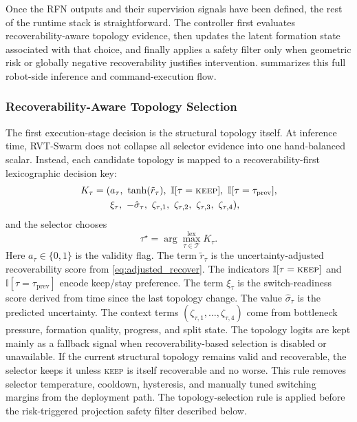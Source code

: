 \documentclass{ieeeaccess}
\newcommand{\cT}{\mathcal{T}}
\begin{document}
Once the RFN outputs and their supervision signals have been defined,
the rest of the runtime stack is straightforward. The controller first
evaluates recoverability-aware topology evidence, then updates the
latent formation state associated with that choice, and finally applies
a safety filter only when geometric risk or globally negative recoverability
justifies intervention.  summarizes this full
robot-side inference and command-execution flow. 

\subsubsection{Recoverability-Aware Topology Selection}
\label{sec:selector}

The first execution-stage decision is the structural topology itself.
At inference time, RVT-Swarm does not collapse all selector evidence
into one hand-balanced scalar. Instead, each candidate topology is
mapped to a recoverability-first lexicographic decision key:
\begin{equation}
\begin{aligned}
K_\tau = (&a_\tau,\ \tanh(\tilde r_\tau),\ \mathbb{I}[\tau=\textsc{keep}],\ \mathbb{I}[\tau=\tau_{\mathrm{prev}}], \\
          &\xi_\tau,\ -\hat\sigma_\tau,\ \zeta_{\tau,1},\ \zeta_{\tau,2},\ \zeta_{\tau,3},\ \zeta_{\tau,4}),
\end{aligned}
\label{eq:selector_key}
\end{equation}
and the selector chooses
\begin{equation}
\tau^\star = \arg\max_{\tau \in \cT}^{\mathrm{lex}} K_\tau.
\label{eq:selector_choice}
\end{equation}
Here $a_\tau\in\{0,1\}$ is the validity flag.
The term $\tilde r_\tau$ is the uncertainty-adjusted recoverability
score from \eqref{eq:adjusted_recover}. The indicators
$\mathbb{I}[\tau=\textsc{keep}]$ and
$\mathbb{I}[\tau=\tau_{\mathrm{prev}}]$ encode keep/stay preference.
The term $\xi_\tau$ is the switch-readiness score derived from time
since the last topology change. The value $\hat\sigma_\tau$ is the
predicted uncertainty. The context terms
$(\zeta_{\tau,1},\dots,\zeta_{\tau,4})$ come from bottleneck pressure,
formation quality, progress, and split state. The topology logits are
kept mainly as a fallback signal when recoverability-based selection is
disabled or unavailable. If the current structural topology remains
valid and recoverable, the selector keeps it unless \textsc{keep} is
itself recoverable and no worse. This rule removes selector
temperature, cooldown, hysteresis, and manually tuned switching
margins from the deployment path. The topology-selection rule is applied
before the risk-triggered projection safety filter described below.
\end{document}
